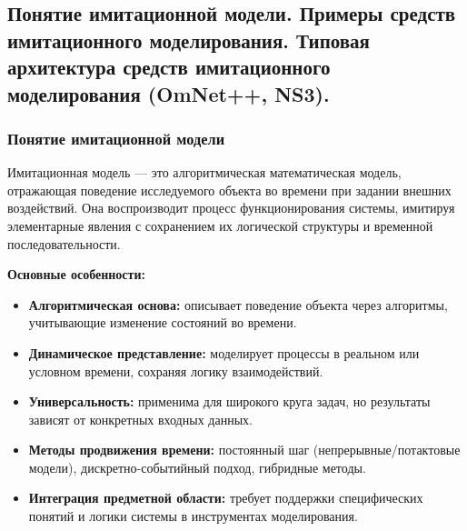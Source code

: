 \subsection{Понятие имитационной модели. Примеры средств имитационного моделирования.
Типовая архитектура средств имитационного моделирования (OmNet++, NS3).}

\subsubsection*{Понятие имитационной модели}
Имитационная модель — это алгоритмическая математическая модель, отражающая
поведение исследуемого объекта во времени при задании внешних воздействий.
Она воспроизводит процесс функционирования системы,
имитируя элементарные явления с сохранением их логической структуры и временной последовательности.

\textbf{Основные особенности:}
\begin{itemize}
    \item \textbf{Алгоритмическая основа:}
		описывает поведение объекта через алгоритмы,
		учитывающие изменение состояний во времени.
    \item \textbf{Динамическое представление:}
		моделирует процессы в реальном или условном времени,
		сохраняя логику взаимодействий.
    \item \textbf{Универсальность:}
		применима для широкого круга задач,
		но результаты зависят от конкретных входных данных.
    \item \textbf{Методы продвижения времени:}
		постоянный шаг (непрерывные/потактовые модели),
		дискретно-событийный подход, гибридные методы.
    \item \textbf{Интеграция предметной области:}
		требует поддержки специфических понятий и логики системы
		в инструментах моделирования.
\end{itemize}


